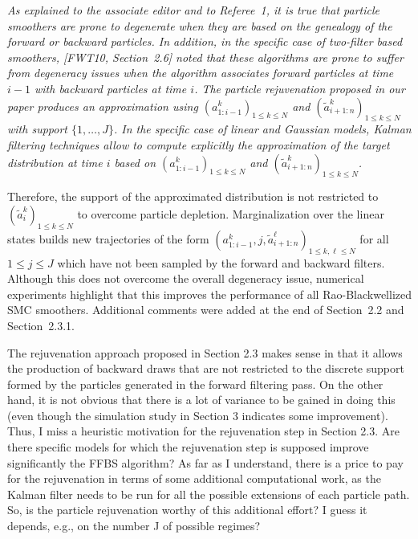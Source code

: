 \vspace{.2cm}
{\em
\noindent As explained to the associate editor and to  Referee~1, it is true that particle smoothers are prone to degenerate when they are based on  the genealogy of the forward or backward particles. In addition, in the specific case of two-filter based smoothers, [FWT10, Section~2.6] noted that these algorithms are prone to suffer from degeneracy issues when the algorithm associates forward particles at time $i-1$ with backward particles at time $i$. 
The particle rejuvenation proposed in our paper produces an approximation using $(a^k_{1:i-1})_{1\le k \le N}$ and $(\tilde{a}^k_{i+1:n})_{1\le k \le N}$ with support $\{1,\ldots,J\}$. In the specific case of linear and Gaussian models, Kalman filtering techniques allow to compute explicitly the approximation of the target distribution at time $i$ based on  $(a^k_{1:i-1})_{1\le k \le N}$ and $(\tilde{a}^k_{i+1:n})_{1\le k \le N}$. 

Therefore, the support of the approximated distribution is not restricted to $(\tilde{a}^k_{i})_{1\le k \le N}$ to overcome particle depletion. Marginalization over the linear states  builds new trajectories of the form $(a^k_{1:i-1},j,\tilde{a}^\ell_{i+1:n})_{1\le k,\ell \le N}$ for all $1\le j \le J$ which have not been sampled by the forward and backward filters. Although this does not overcome the overall degeneracy issue, numerical experiments highlight that this improves the performance of all Rao-Blackwellized SMC smoothers. Additional comments were added at the end of Section~2.2 and Section~2.3.1.
}


\vspace{.5cm}

\noindent The rejuvenation approach proposed in Section 2.3 makes sense in that it allows the
production of backward draws that are not restricted to the discrete support formed by the particles generated in the forward  filtering pass. On the other hand, it is not obvious that there is a lot of variance to be gained in doing this (even though the simulation study in Section 3 indicates some improvement). Thus, I miss a heuristic
motivation for the rejuvenation step in Section 2.3. Are there specific models for which the rejuvenation step is supposed improve significantly the FFBS algorithm? As far as I understand, there is a price to pay for the rejuvenation in terms of some additional computational work, as the Kalman filter needs to be run for all the possible extensions
of each particle path. So, is the particle rejuvenation worthy of this additional effort? I guess it depends, e.g., on the number J of possible regimes?

